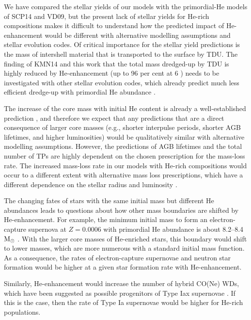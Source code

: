 We have compared the stellar yields of our models with the primordial-He models of SCP14 and VD09, but the present lack of stellar yields for He-rich compositions makes it difficult to understand how the predicted impact of He-enhancement would be different with alternative modelling assumptions and stellar evolution codes. Of critical importance for the stellar yield predictions is the mass of intershell material that is transported to the surface by TDU. The finding of KMN14 and this work that the total mass dredged-up by TDU is highly reduced by He-enhancement (up to 96 per cent at 6 \Msun) needs to be investigated with other stellar evolution codes, which already predict much less efficient dredge-up with primordial He abundance \citep[see e.g.,][]{Mowlavi:1999ul,Lugaro:2003ew,Lugaro:2012ht}.

The increase of the core mass with initial He content is already a well-established prediction \citep[e.g.,][]{Becker:1979jk,Lattanzio:1986cz}, and therefore we expect that any predictions that are a direct consequence of larger core masses (e.g., shorter interpulse periods, shorter AGB lifetimes, and higher luminosities) would be qualitatively similar with alternative modelling assumptions. However, the predictions of AGB lifetimes and the total number of TPs are highly dependent on the chosen prescription for the mass-loss rate. The increased mass-loss rate in our models with He-rich compositions would occur to a different extent with alternative mass loss prescriptions, which have a different dependence on the stellar radius and luminosity \citep[e.g.,][]{Bloecker:1995ui,Straniero:2006do}.

The changing fates of stars with the same initial mass but different He abundances leads to questions about how other mass boundaries are shifted by He-enhancement. For example, the minimum initial mass to form an electron-capture supernova at $Z=0.0006$ with primordial He abundance is about 8.2--8.4 $\mathrm{M}_{\odot}$ \citep{Doherty:2015ek}. With the larger core masses of He-enriched stars, this boundary would shift to lower masses, which are more numerous with a standard initial mass function. As a consequence, the rates of electron-capture supernovae and neutron star formation would be higher at a given star formation rate with He-enhancement.

Similarly, He-enhancement would increase the number of hybrid CO(Ne) WDs, which have been suggested as possible progenitors of Type Iax supernovae \citep{Denissenkov:2015bi,Kromer:2015fk}. If this is the case, then the rate of Type Ia supernovae would be higher for He-rich populations.

